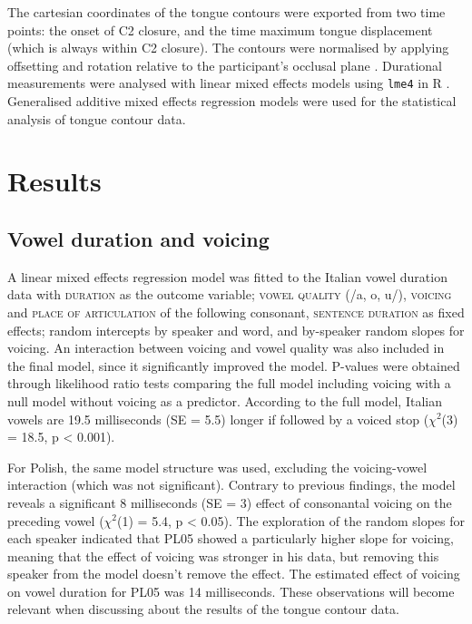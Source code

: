 \documentclass[authoryear, twocolumn]{elsarticle}
\begin{document}
The cartesian coordinates of the tongue contours were exported from two
time points: the onset of C2 closure, and the time maximum tongue
displacement (which is always within C2 closure). The contours were
normalised by applying offsetting and rotation relative to the
participant's occlusal plane \citep{scobbie2011}. Durational
measurements were analysed with linear mixed effects models using
\texttt{lme4} in R \citep{r-core-team2017, bates2015}. Generalised
additive mixed effects regression models \citep[GAMMs,][]{wood2006} were
used for the statistical analysis of tongue contour data.

\section{Results}\label{results}

\subsection{Vowel duration and
voicing}\label{vowel-duration-and-voicing}

A linear mixed effects regression model was fitted to the Italian vowel
duration data with \textsc{duration} as the outcome variable;
\textsc{vowel quality} (/a, o, u/), \textsc{voicing} and
\textsc{place of articulation} of the following consonant,
\textsc{sentence duration} as fixed effects; random intercepts by
speaker and word, and by-speaker random slopes for voicing. An
interaction between voicing and vowel quality was also included in the
final model, since it significantly improved the model. P-values were
obtained through likelihood ratio tests comparing the full model
including voicing with a null model without voicing as a predictor.
According to the full model, Italian vowels are 19.5 milliseconds (SE =
5.5) longer if followed by a voiced stop (\(\chi^2\)(3) = 18.5, p
\textless{} 0.001).

For Polish, the same model structure was used, excluding the
voicing-vowel interaction (which was not significant). Contrary to
previous findings, the model reveals a significant 8 milliseconds (SE =
3) effect of consonantal voicing on the preceding vowel (\(\chi^2\)(1) =
5.4, p \textless{} 0.05). The exploration of the random slopes for each
speaker indicated that PL05 showed a particularly higher slope for
voicing, meaning that the effect of voicing was stronger in his data,
but removing this speaker from the model doesn't remove the effect. The
estimated effect of voicing on vowel duration for PL05 was 14
milliseconds. These observations will become relevant when discussing
about the results of the tongue contour data.
\end{document}
